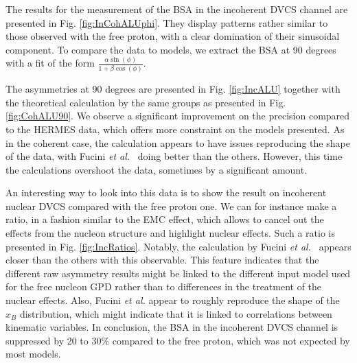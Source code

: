 \documentclass[aps,prc,preprint,superscriptaddress]{revtex4}
\begin{document}
The results for the measurement of the BSA in the incoherent DVCS channel are presented in
Fig. \ref{fig:InCohALUphi}. They display patterns rather similar to those observed with the 
free proton, with a clear domination of their sinusoidal component. To compare the data to 
models, we extract the BSA at 90 degrees with a fit of the form $\frac{\alpha \sin(\phi)}{1+\beta \cos(\phi)}$. 

The asymmetries at 90 degrees are presented in Fig. \ref{fig:IncALU} together with the theoretical
calculation by the same groups as presented in Fig. \ref{fig:CohALU90}. We observe a 
significant improvement on the precision compared to 
the HERMES data, which offers more constraint on the models presented. As in the
coherent case, the calculation appears to have issues reproducing the shape of the data,
with Fucini {\it et al.}~\cite{Fucini:2019xlc} doing better than the others.
However, this time the calculations overshoot the data, sometimes by a significant amount.

An interesting way to look into this data is to show the result on incoherent nuclear DVCS compared 
with the free proton one. We can for instance make a ratio, in a fashion similar to the EMC 
effect, which allows to cancel out
the effects from the nucleon structure and highlight nuclear effects. Such a ratio is presented
in Fig. \ref{fig:IncRatios}.
Notably, the calculation by Fucini {\it et al.}~\cite{Fucini:2019xlc} appears closer than the
others with this observable. This feature indicates that the different raw asymmetry results might be 
linked to the different input model used for the free nucleon GPD rather than to differences in the 
treatment of the nuclear effects. Also, Fucini {\it et al.} appear to roughly reproduce the 
shape of the $x_B$ distribution, which might indicate that it is linked to correlations between kinematic variables.
In conclusion, the BSA in the incoherent DVCS channel is suppressed by 20 to 30\% compared to the free proton,
which was not expected by most models.
\end{document}
